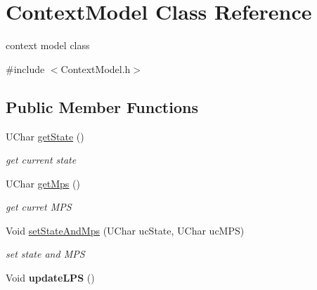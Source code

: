 \hypertarget{class_context_model}{}\section{Context\+Model Class Reference}
\label{class_context_model}


context model class  




{\ttfamily \#include $<$Context\+Model.\+h$>$}

\subsection*{Public Member Functions}
\begin{DoxyCompactItemize}
\item 
\mbox{\label{class_context_model_a119155560379e40c12778c7dcec47ad6}} 
U\+Char \hyperlink{class_context_model_a119155560379e40c12778c7dcec47ad6}{get\+State} ()
\begin{DoxyCompactList}\small\item\em get current state \end{DoxyCompactList}\item 
\mbox{\label{class_context_model_ab163ff84c2c7b5b908d6d0219bc18003}} 
U\+Char \hyperlink{class_context_model_ab163ff84c2c7b5b908d6d0219bc18003}{get\+Mps} ()
\begin{DoxyCompactList}\small\item\em get curret M\+PS \end{DoxyCompactList}\item 
\mbox{\label{class_context_model_a3aa54cbafb0e71b4de10ea6a976e34e8}} 
Void \hyperlink{class_context_model_a3aa54cbafb0e71b4de10ea6a976e34e8}{set\+State\+And\+Mps} (U\+Char uc\+State, U\+Char uc\+M\+PS)
\begin{DoxyCompactList}\small\item\em set state and M\+PS \end{DoxyCompactList}\item 
\mbox{\label{class_context_model_a07da41567a7e8d20c8a2e065c3fc4b83}} 
Void {\bfseries update\+L\+PS} ()
\item 
\mbox{\label{class_context_model_a49c06d908140dfd49d09e66b9356cac6}} 

\end{DoxyCompactItemize}
